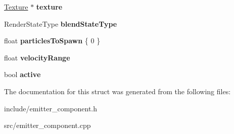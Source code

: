 \begin{DoxyCompactItemize}
\hyperlink{class_blade_1_1_texture}{Texture} $\ast$ {\bfseries texture}
\item 
\mbox{\label{struct_blade_1_1_emitter_descriptor_a157b590550eb8587ead1968030ae432a}} 
Render\+State\+Type {\bfseries blend\+State\+Type}
\item 
\mbox{\label{struct_blade_1_1_emitter_descriptor_a2f0d7f9a227f3f5e6d816b14ec18d7f2}} 
float {\bfseries particles\+To\+Spawn} \{ 0 \}
\item 
\mbox{\label{struct_blade_1_1_emitter_descriptor_a93476142c0c33f767d355b400ab0845c}} 
float {\bfseries velocity\+Range}
\item 
\mbox{\label{struct_blade_1_1_emitter_descriptor_a84142b39476686f7f68c1cf8bb8ef6b1}} 
bool {\bfseries active}
\end{DoxyCompactItemize}


The documentation for this struct was generated from the following files\+:\begin{DoxyCompactItemize}
\item 
include/emitter\+\_\+component.\+h\item 
src/emitter\+\_\+component.\+cpp\end{DoxyCompactItemize}
